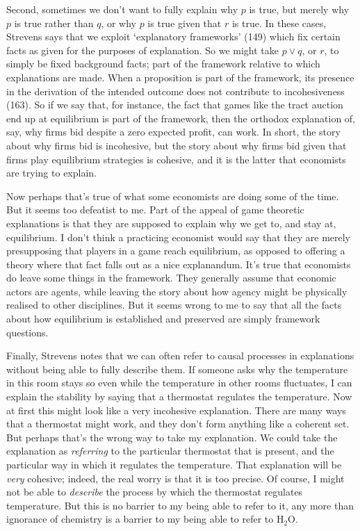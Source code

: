 \documentclass[
  11pt,
  letterpaper,
  DIV=11,
  numbers=noendperiod,
  oneside]{scrartcl}
\begin{document}
Second, sometimes we don't want to fully explain why \(p\) is true, but
merely why \(p\) is true rather than \(q\), or why \(p\) is true given
that \(r\) is true. In these cases, Strevens says that we exploit
`explanatory frameworks' (149) which fix certain facts as given for the
purposes of explanation. So we might take \(p \vee q\), or \(r\), to
simply be fixed background facts; part of the framework relative to
which explanations are made. When a proposition is part of the
framework, its presence in the derivation of the intended outcome does
not contribute to incohesiveness (163). So if we say that, for instance,
the fact that games like the tract auction end up at equilibrium is part
of the framework, then the orthodox explanation of, say, why firms bid
despite a zero expected profit, can work. In short, the story about why
firms bid is incohesive, but the story about why firms bid given that
firms play equilibrium strategies is cohesive, and it is the latter that
economists are trying to explain.

Now perhaps that's true of what some economists are doing some of the
time. But it seems too defeatist to me. Part of the appeal of game
theoretic explanations is that they are supposed to explain why we get
to, and stay at, equilibrium. I don't think a practicing economist would
say that they are merely presupposing that players in a game reach
equilibrium, as opposed to offering a theory where that fact falls out
as a nice explanandum. It's true that economists do leave some things in
the framework. They generally assume that economic actors are agents,
while leaving the story about how agency might be physically realised to
other disciplines. But it seems wrong to me to say that all the facts
about how equilibrium is established and preserved are simply framework
questions.

Finally, Strevens notes that we can often refer to causal processes in
explanations without being able to fully describe them. If someone asks
why the temperature in this room stays so even while the temperature in
other rooms fluctuates, I can explain the stability by saying that a
thermostat regulates the temperature. Now at first this might look like
a very incohesive explanation. There are many ways that a thermostat
might work, and they don't form anything like a coherent set. But
perhaps that's the wrong way to take my explanation. We could take the
explanation as \emph{referring} to the particular thermostat that is
present, and the particular way in which it regulates the temperature.
That explanation will be \emph{very} cohesive; indeed, the real worry is
that it is too precise. Of course, I might not be able to
\emph{describe} the process by which the thermostat regulates
temperature. But this is no barrier to my being able to refer to it, any
more than ignorance of chemistry is a barrier to my being able to refer
to H\(_2\)O.
\end{document}
